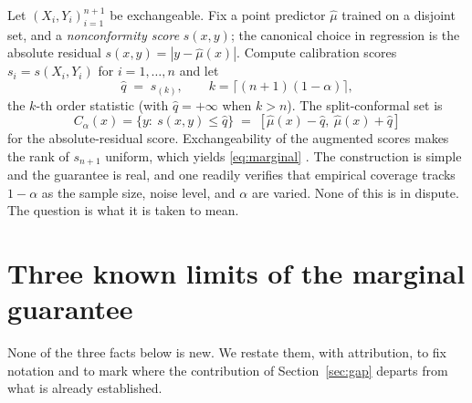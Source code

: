 \documentclass[10pt]{article} %
\theoremstyle{definition}
\begin{document}
Let $(X_i,Y_i)_{i=1}^{n+1}$ be exchangeable. Fix a point predictor $\hat\mu$ trained on
a disjoint set, and a \emph{nonconformity score} $s(x,y)$; the canonical choice in
regression is the absolute residual $s(x,y)=|y-\hat\mu(x)|$. Compute calibration
scores $s_i=s(X_i,Y_i)$ for $i=1,\dots,n$ and let
\begin{equation}\label{eq:q}
  \hat q \;=\; s_{(k)}, \qquad k=\big\lceil (n+1)(1-\alpha)\big\rceil,
\end{equation}
the $k$-th order statistic (with $\hat q=+\infty$ when $k>n$). The split-conformal set is
\begin{equation}\label{eq:set}
  C_\alpha(x)=\{y:\ s(x,y)\le \hat q\}
  \;=\;[\hat\mu(x)-\hat q,\ \hat\mu(x)+\hat q]
\end{equation}
for the absolute-residual score. Exchangeability of the augmented scores makes the rank
of $s_{n+1}$ uniform, which yields \eqref{eq:marginal}
\citep{vovk2005algorithmic,lei2018distribution}. The construction is simple and the
guarantee is real, and one readily verifies that empirical coverage tracks $1-\alpha$ as
the sample size, noise level, and $\alpha$ are varied. None of this is in dispute. The
question is what it is taken to mean.

\section{Three known limits of the marginal guarantee}\label{sec:marginal}

None of the three facts below is new. We restate them, with attribution, to fix notation
and to mark where the contribution of Section~\ref{sec:gap} departs from what is already
established.
\end{document}
